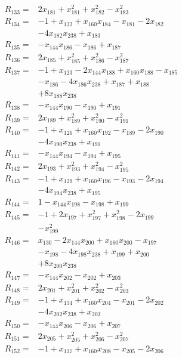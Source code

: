 \begin{align*}
R_{133}={}&2x_{181} +x_{181}^{2} +x_{182}^{2} -x_{183}^{2}\\[3pt]
R_{134}={}&-1 +x_{122} +x_{160}x_{184} -x_{181} -2x_{182}\\
&-4x_{182}x_{238} +x_{183}\\[3pt]
R_{135}={}&-x_{144}x_{186} -x_{186} +x_{187}\\[3pt]
R_{136}={}&2x_{185} +x_{185}^{2} +x_{186}^{2} -x_{187}^{2}\\[3pt]
R_{137}={}&-1 +x_{123} -2x_{144}x_{188} +x_{160}x_{188} -x_{185}\\
&-x_{186} -4x_{186}x_{238} +x_{187} +x_{188}\\
&+8x_{188}x_{238}\\[3pt]
R_{138}={}&-x_{144}x_{190} -x_{190} +x_{191}\\[3pt]
R_{139}={}&2x_{189} +x_{189}^{2} +x_{190}^{2} -x_{191}^{2}\\[3pt]
R_{140}={}&-1 +x_{126} +x_{160}x_{192} -x_{189} -2x_{190}\\
&-4x_{190}x_{238} +x_{191}\\[3pt]
R_{141}={}&-x_{144}x_{194} -x_{194} +x_{195}\\[3pt]
R_{142}={}&2x_{193} +x_{193}^{2} +x_{194}^{2} -x_{195}^{2}\\[3pt]
R_{143}={}&-1 +x_{129} +x_{160}x_{196} -x_{193} -2x_{194}\\
&-4x_{194}x_{238} +x_{195}\\[3pt]
R_{144}={}&1 -x_{144}x_{198} -x_{198} +x_{199}\\[3pt]
R_{145}={}&-1 +2x_{197} +x_{197}^{2} +x_{198}^{2} -2x_{199}\\
&-x_{199}^{2}\\[3pt]
R_{146}={}&x_{130} -2x_{144}x_{200} +x_{160}x_{200} -x_{197}\\
&-x_{198} -4x_{198}x_{238} +x_{199} +x_{200}\\
&+8x_{200}x_{238}\\[3pt]
R_{147}={}&-x_{144}x_{202} -x_{202} +x_{203}\\[3pt]
R_{148}={}&2x_{201} +x_{201}^{2} +x_{202}^{2} -x_{203}^{2}\\[3pt]
R_{149}={}&-1 +x_{134} +x_{160}x_{204} -x_{201} -2x_{202}\\
&-4x_{202}x_{238} +x_{203}\\[3pt]
R_{150}={}&-x_{144}x_{206} -x_{206} +x_{207}\\[3pt]
R_{151}={}&2x_{205} +x_{205}^{2} +x_{206}^{2} -x_{207}^{2}\\[3pt]
R_{152}={}&-1 +x_{137} +x_{160}x_{208} -x_{205} -2x_{206}\\

\end{align*}
